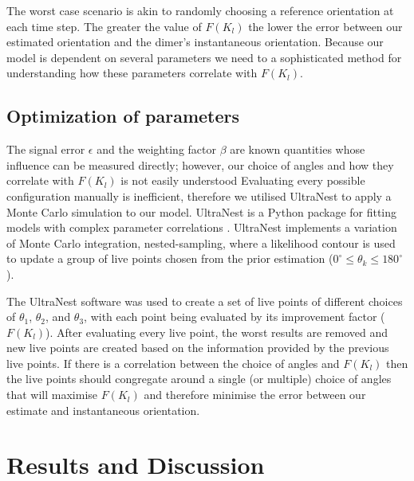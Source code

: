 \documentclass[final, 3p]{elsarticle}
\begin{document}
The worst case scenario is akin to randomly choosing a reference
orientation at each time step. The greater the value of $F(K_l)$ the
lower the error between our estimated orientation and the dimer's
instantaneous orientation. Because our model is dependent on several
parameters we need to a sophisticated method for understanding how
these parameters correlate with $F(K_l)$.


\subsection{Optimization of parameters}
\label{sec:2.4}

The signal error $\epsilon$ and the weighting factor $\beta$ are known
quantities whose influence can be measured directly; however, our
choice of angles and how they correlate with $F(K_l)$ is not easily
understood Evaluating every possible configuration manually is
inefficient, therefore we utilised UltraNest to apply a Monte Carlo
simulation to our model.  UltraNest is a Python package for fitting
models with complex parameter correlations
\cite{Buchner2016Ultranest}.  UltraNest implements a variation of
Monte Carlo integration, nested-sampling, where a likelihood contour
is used to update a group of live points chosen from the prior
estimation ($0^{\circ} \leq \theta_k \leq 180^{\circ}$).

The UltraNest software was used to create a set of live points of
different choices of $\theta_1$, $\theta_2$, and $\theta_3$, with each
point being evaluated by its improvement factor ($F(K_l)$).  After
evaluating every live point, the worst results are removed and new
live points are created based on the information provided by the
previous live points.  If there is a correlation between the choice of
angles and $F(K_l)$ then the live points should congregate around a
single (or multiple) choice of angles that will maximise $F(K_l)$ and
therefore minimise the error between our estimate and instantaneous
orientation.


\section{Results and  Discussion}
\label{sec:Discussion}


\end{document}
